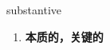 
\begin{frame}
{\huge substantive}
\begin{center}
\begin{enumerate}\Large
  \item \textbf{本质的，关键的}
\end{enumerate}
\end{center}
\end{frame}
